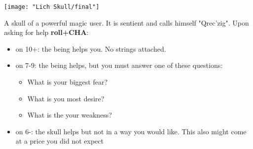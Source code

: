 
\begin{center}
\texttt{[image: "Lich Skull/final"]}
\end{center}
A skull of a powerful magic user. It is sentient and calls himself "Qrec'zig". Upon asking for help \textbf{roll+CHA}:
\begin{itemize}
	\item on 10+: the being helps you. No strings attached.
	\item on 7-9: the being helps, but you must answer one of these questions:
		\begin{itemize}
			\item What is your biggest fear?
			\item What is you most desire?
			\item What is the your weakness?
		\end{itemize}
	\item on 6-: the skull helps but not in a way you would like. This also might come at a price you did not expect
\end{itemize}